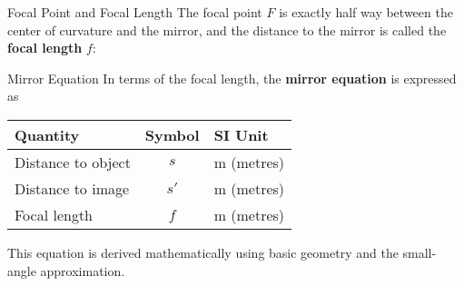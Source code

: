 \documentclass[12pt,compress,aspectratio=169]{beamer}
\newcommand{\eq}[2]{\vspace{#1}{\LARGE\begin{displaymath}#2\end{displaymath}}}
\begin{document}
\begin{frame}{Focal Point and Focal Length}
  The focal point $F$ is exactly half way between the center of curvature and
  the mirror, and the distance to the mirror is called the \textbf{focal length}
  $f$:

  \eq{-.2in}{
    \boxed{f=\frac12 r}
  }
  \begin{center}
  \end{center}
  
\end{frame}


\begin{frame}{Mirror Equation}
  In terms of the focal length, the \textbf{mirror equation} is expressed as

  \eq{-.2in}{
    \boxed{\frac{1}{s}+\frac{1}{s'}=\frac{1}{f}}
  }
  \begin{center}
    \begin{tabular}{l|c|l}
      \rowcolor{pink}
      \textbf{Quantity} & \textbf{Symbol} & \textbf{SI Unit} \\ \hline
      Distance to object & $s$  & \si{\metre} (metres)\\
      Distance to image  & $s'$ & \si{\metre} (metres) \\
      Focal length       & $f$  & \si{\metre} (metres)
    \end{tabular}
  \end{center}
  This equation is derived mathematically using basic geometry and the
  small-angle approximation.
\end{frame}
\end{document}
